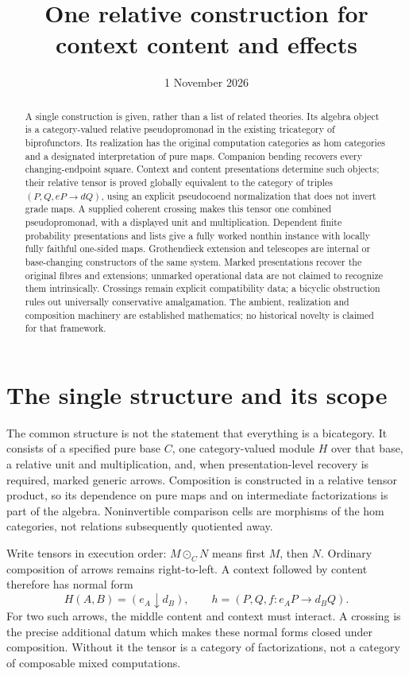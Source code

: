 \documentclass[11pt]{article}
\title{One relative construction for context content and effects}
\author{}
\date{1 November 2026}
\theoremstyle{definition}
\begin{document}
\maketitle
\begin{abstract}
A single construction is given, rather than a list of related theories. Its
algebra object is a category-valued relative pseudopromonad in the existing
tricategory of biprofunctors. Its realization has the original computation
categories as hom categories and a designated interpretation of pure maps.
Companion bending recovers every changing-endpoint square. Context and content
presentations determine such objects; their relative tensor is proved globally
equivalent to the category of triples $(P,Q,eP\to dQ)$, using an explicit
pseudocoend normalization that does not invert grade maps. A supplied coherent
crossing makes this tensor one combined pseudopromonad, with a displayed unit
and multiplication. Dependent finite probability presentations and lists give
a fully worked nonthin instance with locally fully faithful one-sided maps.
Grothendieck extension and telescopes are internal or base-changing constructors
of the same system. Marked presentations recover the original fibres and
extensions; unmarked operational data are not claimed to recognize them
intrinsically. Crossings remain explicit compatibility data; a bicyclic obstruction rules
out universally conservative amalgamation.
The ambient, realization and composition machinery are established mathematics;
no historical novelty is claimed for that framework.
\end{abstract}

\section{The single structure and its scope}

The common structure is not the statement that everything is a bicategory.
It consists of a specified pure base $C$, one category-valued module $H$ over
that base, a relative unit and multiplication, and, when presentation-level
recovery is required, marked generic arrows. Composition is constructed in a
relative tensor product, so its dependence on pure maps and on intermediate
factorizations is part of the algebra. Noninvertible comparison cells are
morphisms of the hom categories, not relations subsequently quotiented away.

Write tensors in execution order: $M\odot_C N$ means first $M$, then $N$.
Ordinary composition of arrows remains right-to-left. A context followed by
content therefore has normal form
\begin{equation}\label{eq:normalform}
 H(A,B)=(e_A\downarrow d_B),\qquad
 h=(P,Q,f:e_AP\longrightarrow d_BQ).
\end{equation}
For two such arrows, the middle content and context must interact. A crossing
is the precise additional datum which makes these normal forms closed under
composition. Without it the tensor is a category of factorizations, not a
category of composable mixed computations.
\end{document}
